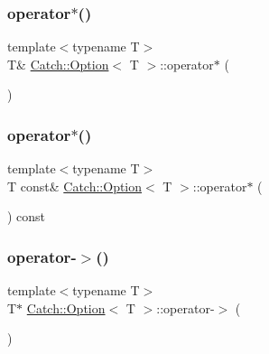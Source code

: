 \hypertarget{class_catch_1_1_option_afd989852fa453731c3190dac63caccb0}{}\label{class_catch_1_1_option_afd989852fa453731c3190dac63caccb0} 
\subsubsection{\texorpdfstring{operator$\ast$()}{operator*()}\hspace{0.1cm}{\footnotesize\ttfamily [1/2]}}
{\footnotesize\ttfamily template$<$typename T$>$ \\
T\& \hyperlink{class_catch_1_1_option}{Catch\+::\+Option}$<$ T $>$\+::operator$\ast$ (\begin{DoxyParamCaption}{ }\end{DoxyParamCaption})\hspace{0.3cm}{\ttfamily [inline]}}

\hypertarget{class_catch_1_1_option_a734fc9c2eb1a1f7f8e8f6a4eb12160f0}{}\label{class_catch_1_1_option_a734fc9c2eb1a1f7f8e8f6a4eb12160f0} 
\subsubsection{\texorpdfstring{operator$\ast$()}{operator*()}\hspace{0.1cm}{\footnotesize\ttfamily [2/2]}}
{\footnotesize\ttfamily template$<$typename T$>$ \\
T const\& \hyperlink{class_catch_1_1_option}{Catch\+::\+Option}$<$ T $>$\+::operator$\ast$ (\begin{DoxyParamCaption}{ }\end{DoxyParamCaption}) const\hspace{0.3cm}{\ttfamily [inline]}}

\hypertarget{class_catch_1_1_option_acad340798a16c8f700f8763119e90f31}{}\label{class_catch_1_1_option_acad340798a16c8f700f8763119e90f31} 
\subsubsection{\texorpdfstring{operator-\/$>$()}{operator->()}\hspace{0.1cm}{\footnotesize\ttfamily [1/2]}}
{\footnotesize\ttfamily template$<$typename T$>$ \\
T$\ast$ \hyperlink{class_catch_1_1_option}{Catch\+::\+Option}$<$ T $>$\+::operator-\/$>$ (\begin{DoxyParamCaption}{ }\end{DoxyParamCaption})\hspace{0.3cm}{\ttfamily [inline]}}

